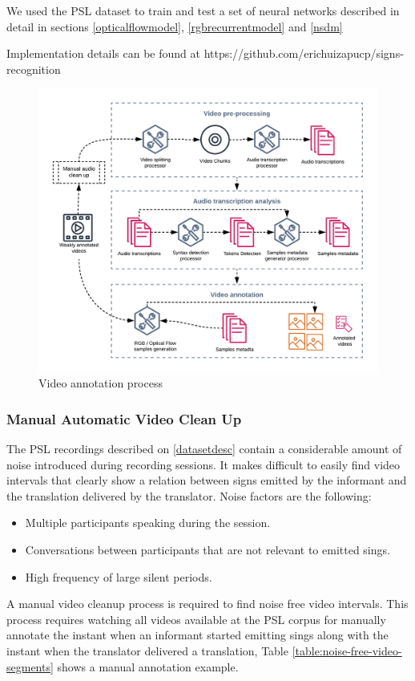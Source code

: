 \documentclass[twocolumn,conference]{article}
\begin{document}
We used the PSL dataset to train and test a set of neural networks described in detail in sections \ref{opticalflowmodel}, \ref{rgbrecurrentmodel} and \ref{nsdm}

Implementation details can be found at https://github.com/erichuizapucp/signs-recognition

\begin{figure}[hbt!]
\includegraphics[width=\linewidth]{images/video-annotation-pipeline.png}
\caption{Video annotation process}
\label{fig:video-annotation-pipeline}
\end{figure}

\subsubsection{Manual Automatic Video Clean Up}\label{manual-video-cleanup}
The PSL recordings described on \ref{datasetdesc} contain a considerable amount of noise introduced during recording sessions. It makes difficult to easily find video intervals that clearly show a relation between signs emitted by the informant and the translation delivered by the translator. Noise factors are the following:
\begin{itemize}
	\item Multiple participants speaking during the session.
	\item Conversations between participants that are not relevant to emitted sings.
	\item High frequency of large silent periods.
\end{itemize}
A manual video cleanup process is required to find noise free video intervals. This process requires watching all videos available at the PSL corpus for manually annotate the instant when an informant started emitting sings along with the instant when the translator delivered a translation, Table \ref{table:noise-free-video-segments} shows a manual annotation example.
\end{document}
